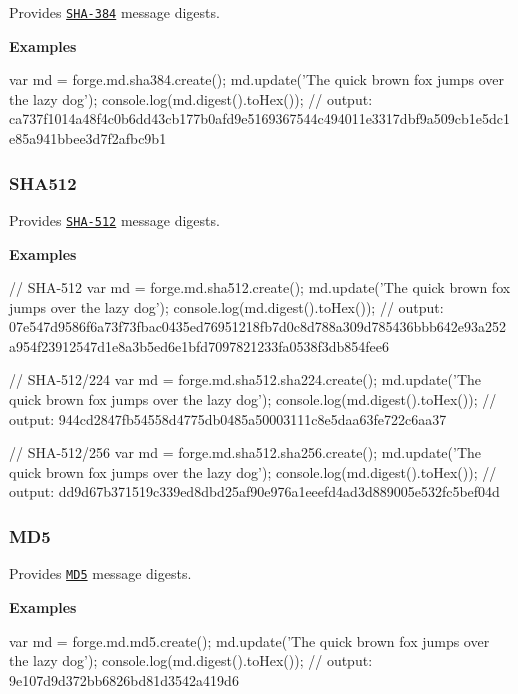 Provides \href{http://en.wikipedia.org/wiki/SHA-384}{\tt S\+H\+A-\/384} message digests.

{\bfseries Examples}


\begin{DoxyCode}
var md = forge.md.sha384.create();
md.update('The quick brown fox jumps over the lazy dog');
console.log(md.digest().toHex());
// output: ca737f1014a48f4c0b6dd43cb177b0afd9e5169367544c494011e3317dbf9a509cb1e5dc1e85a941bbee3d7f2afbc9b1
\end{DoxyCode}


\label{_sha512}%
 \subsubsection*{S\+H\+A512}

Provides \href{http://en.wikipedia.org/wiki/SHA-512}{\tt S\+H\+A-\/512} message digests.

{\bfseries Examples}


\begin{DoxyCode}
// SHA-512
var md = forge.md.sha512.create();
md.update('The quick brown fox jumps over the lazy dog');
console.log(md.digest().toHex());
// output:
       07e547d9586f6a73f73fbac0435ed76951218fb7d0c8d788a309d785436bbb642e93a252a954f23912547d1e8a3b5ed6e1bfd7097821233fa0538f3db854fee6

// SHA-512/224
var md = forge.md.sha512.sha224.create();
md.update('The quick brown fox jumps over the lazy dog');
console.log(md.digest().toHex());
// output: 944cd2847fb54558d4775db0485a50003111c8e5daa63fe722c6aa37

// SHA-512/256
var md = forge.md.sha512.sha256.create();
md.update('The quick brown fox jumps over the lazy dog');
console.log(md.digest().toHex());
// output: dd9d67b371519c339ed8dbd25af90e976a1eeefd4ad3d889005e532fc5bef04d
\end{DoxyCode}


\label{_md5}%
 \subsubsection*{M\+D5}

Provides \href{http://en.wikipedia.org/wiki/MD5}{\tt M\+D5} message digests.

{\bfseries Examples}


\begin{DoxyCode}
var md = forge.md.md5.create();
md.update('The quick brown fox jumps over the lazy dog');
console.log(md.digest().toHex());
// output: 9e107d9d372bb6826bd81d3542a419d6
\end{DoxyCode}


